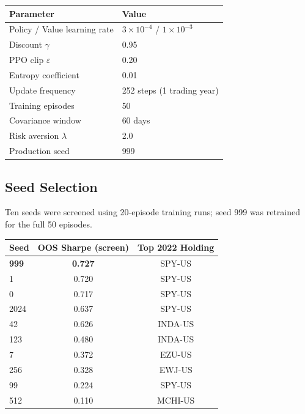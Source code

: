 \documentclass[11pt, a4paper]{article}
\begin{document}
\begin{center}
\begin{tabular}{ll}
\toprule
\textbf{Parameter} & \textbf{Value} \\
\midrule
Policy / Value learning rate  & $3{\times}10^{-4}$ / $1{\times}10^{-3}$ \\
Discount $\gamma$             & 0.95 \\
PPO clip $\varepsilon$        & 0.20 \\
Entropy coefficient           & 0.01 \\
Update frequency              & 252 steps (1 trading year) \\
Training episodes             & 50 \\
Covariance window             & 60 days \\
Risk aversion $\lambda$       & 2.0 \\
Production seed               & 999 \\
\bottomrule
\end{tabular}
\end{center}

\subsection{Seed Selection}

Ten seeds were screened using 20-episode training runs; seed 999 was retrained for the full 50 episodes.

\begin{center}
\begin{tabular}{lcc}
\toprule
\textbf{Seed} & \textbf{OOS Sharpe (screen)} & \textbf{Top 2022 Holding} \\
\midrule
\textbf{999}  & \textbf{0.727} & SPY-US \\
1             & 0.720          & SPY-US \\
0             & 0.717          & SPY-US \\
2024          & 0.637          & SPY-US \\
42            & 0.626          & INDA-US \\
123           & 0.480          & INDA-US \\
7             & 0.372          & EZU-US \\
256           & 0.328          & EWJ-US \\
99            & 0.224          & SPY-US \\
512           & 0.110          & MCHI-US \\
\bottomrule
\end{tabular}
\end{center}
\end{document}
